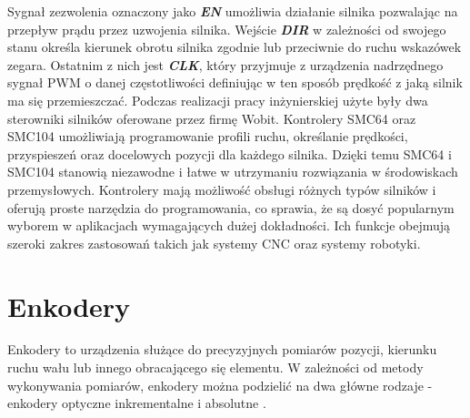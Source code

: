 \noindent Sygnał zezwolenia oznaczony jako \textbf{\textit{EN}} umożliwia działanie silnika pozwalając na przepływ prądu przez uzwojenia silnika. Wejście \textbf{\textit{DIR}} w zależności od swojego stanu określa kierunek obrotu silnika zgodnie lub przeciwnie do ruchu wskazówek zegara. Ostatnim z nich jest \textbf{\textit{CLK}}, który przyjmuje z urządzenia nadrzędnego sygnał PWM o danej częstotliwości definiując w ten sposób prędkość z jaką silnik ma się przemieszczać.\newline
\noindent Podczas realizacji pracy inżynierskiej użyte były dwa sterowniki silników oferowane przez firmę Wobit. Kontrolery SMC64 oraz SMC104 umożliwiają programowanie profili ruchu, określanie prędkości, przyspieszeń oraz docelowych pozycji dla każdego silnika. Dzięki temu SMC64 i SMC104 stanowią niezawodne i łatwe w utrzymaniu rozwiązania w środowiskach przemysłowych. Kontrolery mają możliwość obsługi różnych typów silników i oferują proste narzędzia do programowania, co sprawia, że są dosyć popularnym wyborem w aplikacjach wymagających dużej dokładności. Ich funkcje obejmują szeroki zakres zastosowań takich jak systemy CNC oraz systemy robotyki.


\section{Enkodery}
Enkodery to urządzenia służące do precyzyjnych pomiarów pozycji, kierunku ruchu wału lub innego obracającego się elementu. W zależności od metody wykonywania pomiarów, enkodery można podzielić na dwa główne rodzaje - enkodery optyczne inkrementalne i absolutne \cite{enkoder}.\newline 

